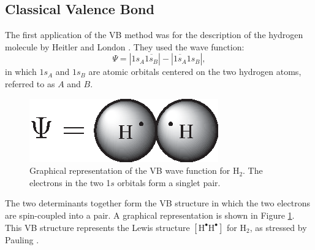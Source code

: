 \subsection{Classical Valence Bond}

The first application of the VB method was for the description of the hydrogen molecule by Heitler and London \cite{heitler}. They used the wave function:
\begin{equation}
\Psi = |1s_{A}\overline{1s_{B}}| - |\overline{1s_{A}}1s_{B}|,
\label{ch1.eq.hl}
\end{equation}
in which $1s_{A}$ and $1s_{B}$ are atomic orbitals centered on the two hydrogen atoms, referred to as $A$ and $B$.
\begin{figure}[htp]
\center
\includegraphics[scale=1]{introduction/figures/heitler.eps}
\caption{Graphical representation of the VB wave function for $\mathrm{H_2}$. The electrons in the two 1$s$ orbitals form a singlet pair.}
\label{ch1.fig.heitler}
\end{figure}
The two determinants together form the VB structure in which the two electrons are spin-coupled into a pair. A graphical representation is shown in Figure \ref{ch1.fig.heitler}. This VB structure represents the Lewis structure $\mathrm{[H^\bullet H^\bullet]}$ for H$_2$, as stressed by Pauling \cite{hllewis}. 

